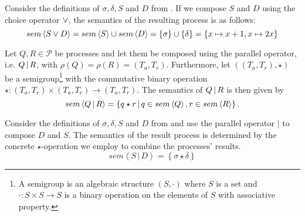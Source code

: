 \begin{example}
\label{exp:sem_chice}
Consider the definitions of $\sigma, \delta, S$ and $D$ from . If we compose $S$ and $D$ using the choice operator $\vee$, the semantics of the resulting process is as follows:
  \begin{equation}
    sem \left\langle S \vee D \right\rangle = sem \left\langle S \right\rangle \cup sem \left\langle D \right\rangle = \left\{ \sigma \right\} \cup \left\{ \delta \right\} = \left\{ x \mapsto x+1, x \mapsto 2x \right\}
  \end{equation}
  \hfill\qedsymbol
\end{example}


\begin{definition}
\label{def:sem_parallel}
Let $Q, R \in \mathcal{P}$ be processes and let them be composed using the parallel operator, i.e. $Q \,|\, R$, with $\rho \left( Q \right) = \rho \left( R \right) = \left( T_a, T_r \right)$. Furthermore, let $\left( \left( T_a, T_r \right), \star \right)$ be a semigroup\footnote{A semigroup is an algebraic structure $(S, \cdot)$ where $S$ is a set and $\cdot\colon S \times S \to S$ is a binary operation on the elements of $S$ with associative property.} with the commutative binary operation $\star \colon \left( T_a, T_r \right) \times \left( T_a, T_r \right) \to \left( T_a, T_r \right)$. The semantics of $Q \,|\, R$ is then given by %
  \begin{equation}
    \label{eqn:sem_parallel}
    sem \left\langle Q \,|\, R \right\rangle = \left\{ q \star r \,|\, q \in sem \left\langle Q \right\rangle, r \in sem \left\langle R \right\rangle \right\}.
  \end{equation}
  \hfill\qedsymbol
\end{definition}



\begin{example}
\label{exp:sem_parallel}
Consider the definitions of $\sigma, \delta, S$ and $D$ from  and use the parallel operator $|$ to compose $D$ and $S$. The semantics of the result process is determined by the concrete $\star$-operation we employ to combine the processes' results.
  \begin{equation}
    sem \left\langle S \,|\, D \right\rangle = \left\{ \sigma \star \delta \right\}
  \end{equation}
  \hfill\qedsymbol
\end{example}

